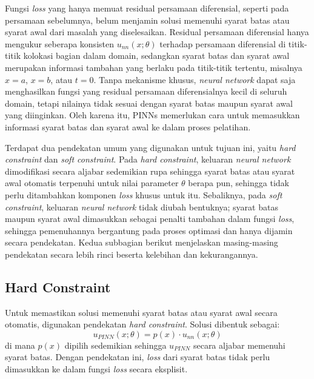 \documentclass[12pt, letterpaper]{article}
\begin{document}
Fungsi \textit{loss} yang hanya memuat residual persamaan diferensial, seperti pada persamaan sebelumnya, belum menjamin solusi memenuhi syarat batas atau syarat awal dari
masalah yang diselesaikan. Residual persamaan diferensial hanya mengukur seberapa konsisten
$u_{nn}(x;\theta)$ terhadap persamaan diferensial di titik-titik kolokasi
bagian dalam domain, sedangkan syarat batas dan syarat awal merupakan
informasi tambahan yang berlaku pada titik-titik tertentu, misalnya $x=a$,
$x=b$, atau $t=0$. Tanpa mekanisme khusus, \textit{neural network} dapat saja
menghasilkan fungsi yang residual persamaan diferensialnya kecil di seluruh domain, tetapi nilainya tidak sesuai dengan syarat batas maupun syarat awal yang diinginkan.
Oleh karena itu, PINNs memerlukan cara untuk memasukkan informasi syarat
batas dan syarat awal ke dalam proses pelatihan.

Terdapat dua pendekatan umum yang digunakan untuk tujuan ini, yaitu
\textit{hard constraint} dan \textit{soft constraint}. Pada \textit{hard
constraint}, keluaran \textit{neural network} dimodifikasi secara aljabar sedemikian rupa
sehingga syarat batas atau syarat awal otomatis terpenuhi untuk nilai
parameter $\theta$ berapa pun, sehingga tidak perlu ditambahkan komponen
\textit{loss} khusus untuk itu. Sebaliknya, pada \textit{soft constraint},
keluaran \textit{neural network} tidak diubah bentuknya; syarat batas maupun syarat awal
dimasukkan sebagai penalti tambahan dalam fungsi \textit{loss}, sehingga
pemenuhannya bergantung pada proses optimasi dan hanya dijamin secara
pendekatan. Kedua subbagian berikut menjelaskan masing-masing pendekatan
secara lebih rinci beserta kelebihan dan kekurangannya.

\subsection{Hard Constraint}

Untuk memastikan solusi memenuhi syarat batas atau syarat awal secara
otomatis, digunakan pendekatan \textit{hard constraint}. Solusi dibentuk sebagai:
\begin{equation}
    u_{PINN}(x;\theta) = p(x) \cdot u_{nn}(x;\theta)
\end{equation}
di mana $p(x)$ dipilih sedemikian sehingga $u_{PINN}$ secara aljabar
memenuhi syarat batas. Dengan pendekatan ini, \textit{loss} dari syarat batas
tidak perlu dimasukkan ke dalam fungsi \textit{loss} secara eksplisit.
\end{document}
